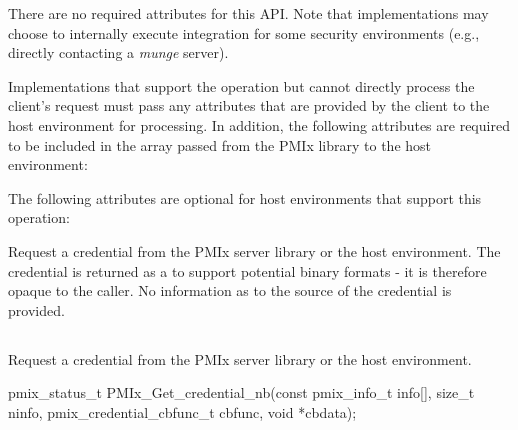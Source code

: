 \reqattrstart
There are no required attributes for this \ac{API}. Note that implementations may choose to internally
execute integration for some security environments (e.g., directly
contacting a \textit{munge} server).

Implementations that support the operation but cannot directly process the client's request must pass any attributes that are provided by the client to the host environment for processing. In addition, the following attributes are required to be included in the  array passed from the \ac{PMIx} library to the host environment:


\reqattrend

\optattrstart
The following attributes are optional for host environments that support this operation:


\optattrend

\descr

Request a credential from the \ac{PMIx} server library or the host environment. The credential is returned as a  to support potential binary formats - it is therefore opaque to the caller. No information as to the source of the credential is provided.


\subsection{}

\summary

Request a credential from the \ac{PMIx} server library or the host environment.

\format

\cspecificstart
\begin{codepar}
pmix_status_t
PMIx_Get_credential_nb(const pmix_info_t info[], size_t ninfo,
                       pmix_credential_cbfunc_t cbfunc,
                       void *cbdata);
\end{codepar}
\cspecificend

\begin{arglist}
\end{arglist}

